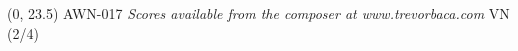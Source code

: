 \documentclass[11pt]{report}
\begin{document}
\begin{textblock}{23}(0, 23.5)
AWN-017 \hfill
\textit{Scores available from the composer at www.trevorbaca.com} \hfill
VN (2/4)
\end{textblock}
\end{document}
